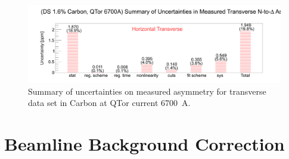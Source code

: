 \begin{figure}[!h]
	\begin{center}
	\includegraphics[width=15.0cm]{figures/errorChartC_6700A}
	\end{center}
	\caption
	{Summary of uncertainties on measured asymmetry for transverse data set in Carbon at QTor current 6700~A.}
	\label{fig:errorChartC_6700A}
\end{figure}



\section{Beamline Background Correction}
\label{Beamline Background Correction}


